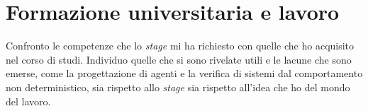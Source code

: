 
\section{Formazione universitaria e lavoro}

Confronto le competenze che lo \emph{stage} mi ha richiesto con quelle che ho acquisito nel corso di
studi. Individuo quelle che si sono rivelate utili e le lacune che sono emerse, come la
progettazione di agenti e la verifica di sistemi dal comportamento non deterministico, sia rispetto
allo \emph{stage} sia rispetto all’idea che ho del mondo del lavoro.
